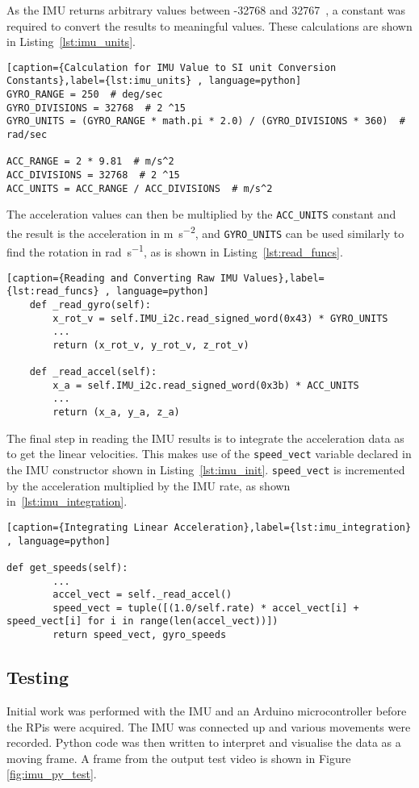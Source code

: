 As the IMU returns arbitrary values between -32768 and 32767~\cite{MPU6050Datasheet},
a constant was required to convert the results to meaningful values. These calculations are shown in Listing~\ref{lst:imu_units}.

\begin{lstlisting}[caption={Calculation for IMU Value to SI unit Conversion Constants},label={lst:imu_units} , language=python]
GYRO_RANGE = 250  # deg/sec
GYRO_DIVISIONS = 32768  # 2 ^15
GYRO_UNITS = (GYRO_RANGE * math.pi * 2.0) / (GYRO_DIVISIONS * 360)  # rad/sec

ACC_RANGE = 2 * 9.81  # m/s^2
ACC_DIVISIONS = 32768  # 2 ^15
ACC_UNITS = ACC_RANGE / ACC_DIVISIONS  # m/s^2
\end{lstlisting}

The acceleration values can then be multiplied by the \verb|ACC_UNITS|
constant and the result is the acceleration in \si{\metre\per\second\squared}, and \verb|GYRO_UNITS|
can be used similarly to find the rotation in \si{\radian\per\second}, as is
shown in Listing~\ref{lst:read_funcs}.


\begin{lstlisting}[caption={Reading and Converting Raw IMU Values},label={lst:read_funcs} , language=python]
    def _read_gyro(self):
        x_rot_v = self.IMU_i2c.read_signed_word(0x43) * GYRO_UNITS
		...
        return (x_rot_v, y_rot_v, z_rot_v)

    def _read_accel(self):
        x_a = self.IMU_i2c.read_signed_word(0x3b) * ACC_UNITS
		...
        return (x_a, y_a, z_a)
\end{lstlisting}

The final step in reading the IMU results is to integrate the acceleration
data as to get the linear velocities. This makes use of the \verb|speed_vect| variable declared in the IMU constructor shown in Listing~\ref{lst:imu_init}. \verb|speed_vect| is incremented by the
acceleration multiplied by the IMU rate, as shown in~\ref{lst:imu_integration}.

\begin{lstlisting}[caption={Integrating Linear Acceleration},label={lst:imu_integration} , language=python]

def get_speeds(self):
		...
        accel_vect = self._read_accel()
        speed_vect = tuple([(1.0/self.rate) * accel_vect[i] + speed_vect[i] for i in range(len(accel_vect))])
        return speed_vect, gyro_speeds
\end{lstlisting}


\subsection{Testing}\label{elec/imu/test}
Initial work was performed with the IMU and an Arduino microcontroller
before the RPis were acquired. The IMU was connected up and various
movements were recorded. Python code was then written to interpret and
visualise the data as a moving frame. A frame from the output test video is shown in Figure \ref{fig:imu_py_test}.

